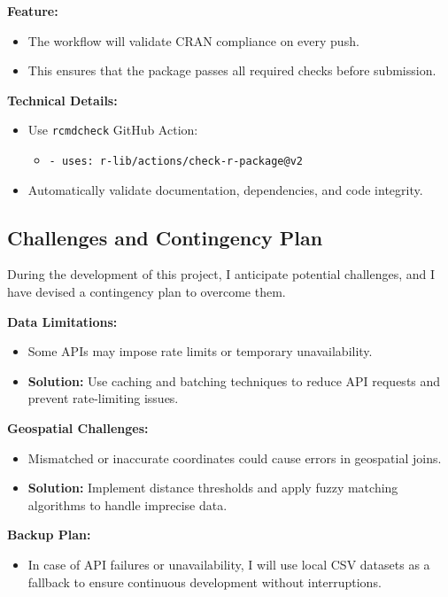 \documentclass{article}
\newcommand{\code}[1]{\colorbox{customgray}{\texttt{#1}}}
\begin{document}
\textbf{Feature:}
\begin{itemize}
    \item The workflow will validate CRAN compliance on every push.
    \item This ensures that the package passes all required checks before submission.
\end{itemize}

\textbf{Technical Details:}
\begin{itemize}
    \item Use \code{rcmdcheck} GitHub Action:
    \begin{itemize}
        \item \code{- uses: r-lib/actions/check-r-package@v2}
    \end{itemize}
    \item Automatically validate documentation, dependencies, and code integrity.
\end{itemize}

\subsection{Challenges and Contingency Plan}
During the development of this project, I anticipate potential challenges, and I have devised a contingency plan to overcome them.

\textbf{Data Limitations:}
\begin{itemize}
    \item Some APIs may impose rate limits or temporary unavailability.
    \item \textbf{Solution:} Use caching and batching techniques to reduce API requests and prevent rate-limiting issues.
\end{itemize}

\textbf{Geospatial Challenges:}
\begin{itemize}
    \item Mismatched or inaccurate coordinates could cause errors in geospatial joins.
    \item \textbf{Solution:} Implement distance thresholds and apply fuzzy matching algorithms to handle imprecise data.
\end{itemize}

\textbf{Backup Plan:}
\begin{itemize}
    \item In case of API failures or unavailability, I will use local CSV datasets as a fallback to ensure continuous development without interruptions.
\end{itemize}
\end{document}
